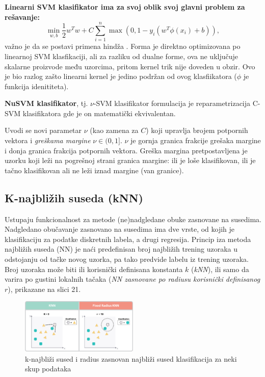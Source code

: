 \documentclass[fontsize=12bp, paper=a4]{scrarticle}
\begin{document}
\vbox{}

\textbf{Linearni SVM klasifikator ima za svoj oblik svoj  glavni problem za rešavanje:}
$$\min_ {w, b} \frac{1}{2} w^T w + C \sum_{i=1}^{n}\max(0, 1 - y_i (w^T \phi(x_i) + b)),$$
važno je da se postavi primena hindža%
. Forma je direktno optimizovana po linearnoj SVM klasfikaciji, ali za razliku od dualne forme, ova ne uključuje skalarne proizvode među uzorcima, pritom kernel trik nije doveden u obzir. Ovo je bio razlog zašto linearni kernel je jedino podržan od ovog klasfiikatora ($\phi$ je funkcija idenititeta).

\vbox{}

\textbf{NuSVM klasifikator}, tj. $\nu$-SVM klasifikator formulacija je reparametrizacija C-SVM klasifikatora gde je on matematički ekvivalentan.

Uvodi se novi parametar $\nu$ (kao zamena za $C$) koji upravlja brojem potpornih vektora i \textit{greškama margine} $\nu \in (0,1]$. $\nu$ je gornja granica frakcije grešaka margine i donja granica frakcija potpornih vektora. Greška margina pretpostavljena je uzorku koji leži na pogrešnoj strani granica margine: ili je loše klasifikovan, ili je tačno klasifikovan ali ne leži iznad margine (van granice). 

\newpage
\subsection{K-najbližih suseda (kNN)}

Ustupaju funkcionalnost za metode (ne)nadgledane obuke zasnovane na susedima.\cite{knn} Nadgledano obučavanje zasnovano na susedima ima dve vrste, od kojih je klasifikaciju za podatke diskretnih labela, a drugi regresija. Princip iza metoda najbližih suseda (NN) je naći predefinisan broj najbližih trening uzoraka u odstojanju od tačke novog uzorka, pa tako predvide labelu iz trening uzoraka. Broj uzoraka može biti ili korisnički definisana konstanta $k$ (\textit{kNN}), ili samo da varira po gustini lokalnih tačaka (\textit{NN zasnovane po radiusu korisnički definisanog $r$}), prikazane na slici 21. 

\begin{figure}[h!]
    \centering
    \includegraphics[width=0.5\textwidth]{image-21.png}
    \caption{k-najbliži sused i radius zasnovan najbliži sused klasifikacija za neki skup podataka}
\end{figure}
\end{document}
